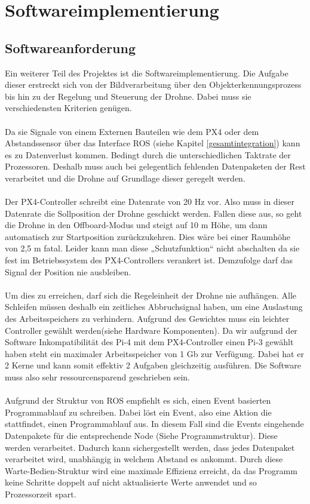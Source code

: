 \chapter{Softwareimplementierung}
\label{software}
\section{Softwareanforderung}
Ein weiterer Teil des Projektes ist die Softwareimplementierung. Die Aufgabe dieser erstreckt sich von der Bildverarbeitung über den Objekterkennungsprozess bis hin zu der Regelung und Steuerung der Drohne. Dabei muss sie verschiedensten Kriterien genügen.\\
\\
Da sie Signale von einem Externen Bauteilen wie dem PX4 oder dem Abstandssensor über das Interface ROS (siehe Kapitel \ref{gesamtintegration}) kann es zu Datenverlust kommen. Bedingt durch die unterschiedlichen Taktrate der Prozessoren. Deshalb muss auch bei gelegentlich fehlenden Datenpaketen der Rest verarbeitet und die Drohne auf Grundlage dieser geregelt werden.\\
\\
Der PX4-Controller schreibt eine Datenrate von 20 Hz vor. Also muss in dieser Datenrate die Sollposition der Drohne geschickt werden. Fallen diese aus, so geht die Drohne in den Offboard-Modus und steigt auf 10 m Höhe, um dann automatisch zur Startposition zurückzukehren. Dies wäre bei einer Raumhöhe von 2,5 m fatal. Leider kann man diese „Schutzfunktion“ nicht abschalten da sie fest im Betriebssystem des PX4-Controllers verankert ist. Demzufolge darf das Signal der Position nie ausbleiben.\\
\\
Um dies zu erreichen, darf sich die Regeleinheit der Drohne nie aufhängen. Alle Schleifen müssen deshalb ein zeitliches Abbruchsignal haben, um eine Auslastung des Arbeitsspeichers zu verhindern. Aufgrund des Gewichtes muss ein leichter Controller gewählt werden(siehe Hardware Komponenten). Da wir aufgrund der Software Inkompatibilität des Pi-4 mit dem PX4-Controller einen Pi-3 gewählt haben steht ein maximaler Arbeitsspeicher von 1 Gb zur Verfügung. Dabei hat er 2 Kerne und kann somit effektiv 2 Aufgaben gleichzeitig ausführen. Die Software muss also sehr ressourcensparend geschrieben sein.\\
\\
Aufgrund der Struktur von ROS empfiehlt es sich, einen Event basierten Programmablauf zu schreiben. Dabei löst ein Event, also eine Aktion die stattfindet, einen Programmablauf aus. In diesem Fall sind die Events eingehende Datenpakete für die entsprechende Node (Siehe Programmstruktur). Diese werden verarbeitet. Dadurch kann sichergestellt werden, dass jedes Datenpaket verarbeitet wird, unabhängig in welchem Abstand es ankommt. Durch diese Warte-Bedien-Struktur wird eine maximale Effizienz erreicht, da das Programm keine Schritte doppelt auf nicht aktualisierte Werte anwendet und so Prozessorzeit spart.
